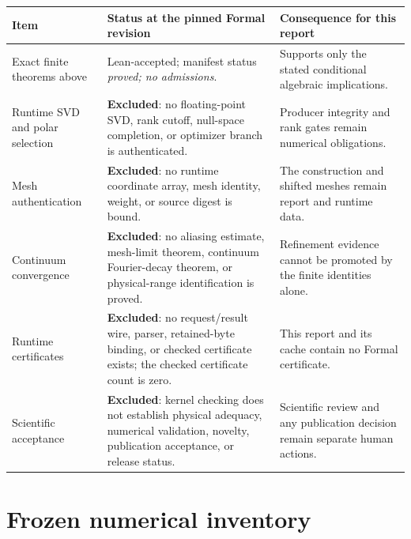 \documentclass[11pt]{article}
\begin{document}
\begin{center}\small
\begin{tabularx}{\textwidth}{>{\raggedright\arraybackslash}p{}YY}
\toprule
Item & Status at the pinned Formal revision & Consequence for this report \\
\midrule
Exact finite theorems above & Lean-accepted; manifest status \emph{proved; no admissions}. & Supports only the stated conditional algebraic implications. \\
Runtime SVD and polar selection & \textbf{Excluded}: no floating-point SVD, rank cutoff, null-space completion, or optimizer branch is authenticated. & Producer integrity and rank gates remain numerical obligations. \\
Mesh authentication & \textbf{Excluded}: no runtime coordinate array, mesh identity, weight, or source digest is bound. & The construction and shifted meshes remain report and runtime data. \\
Continuum convergence & \textbf{Excluded}: no aliasing estimate, mesh-limit theorem, continuum Fourier-decay theorem, or physical-range identification is proved. & Refinement evidence cannot be promoted by the finite identities alone. \\
Runtime certificates & \textbf{Excluded}: no request/result wire, parser, retained-byte binding, or checked certificate exists; the checked certificate count is zero. & This report and its cache contain no Formal certificate. \\
Scientific acceptance & \textbf{Excluded}: kernel checking does not establish physical adequacy, numerical validation, novelty, publication acceptance, or release status. & Scientific review and any publication decision remain separate human actions. \\
\bottomrule
\end{tabularx}
\end{center}

\section{Frozen numerical inventory}
\label{app:inventory}
\end{document}
